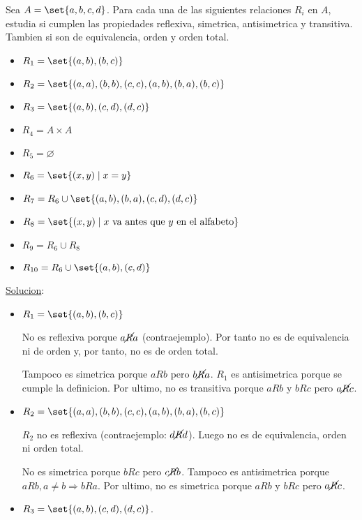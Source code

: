 \begin{example}
	Sea \(A = \set{a,b,c,d}\). Para cada una de las siguientes relaciones \(R_i \) en \(A \), estudia si cumplen las propiedades reflexiva, simetrica, antisimetrica y transitiva. Tambien si son de equivalencia, orden y orden total.
	\begin{itemize}
		\item \(R_1 = \set{(a,b), (b,c )}\)
		\item \(R_2 = \set{(a,a), (b,b), (c,c), (a,b), (b,a), (b,c )}\)
		\item \(R_3 = \set{(a,b), (c,d), (d,c )}\)
		\item \(R_4 = A \times A \)
		\item \(R_5 = \varnothing \)
		\item \(R_6 = \set{(x,y) \mid x = y }\)
		\item \(R_7 = R_6 \cup \set{(a,b), (b,a), (c,d), (d,c)}\)
		\item \(R_8 = \set{(x,y) \mid x \text{ va antes que } y \text{ en el alfabeto} }\)
		\item \(R_9 = R_6 \cup R_8 \)
		\item \(R_{10} = R_6 \cup \set{(a,b), (c,d)}\)
	\end{itemize}
	\underline{Solucion}:

	\begin{itemize}
		\item \(R_1 = \set{(a,b), (b,c )}\)

		      No es reflexiva porque \(a\cancel R a \) (contraejemplo). Por tanto no es de equivalencia ni de orden y, por tanto, no es de orden total.

		      Tampoco es simetrica porque \(aRb \) pero \(b \cancel R a \). \(R_1 \) es antisimetrica porque se cumple la definicion. Por ultimo, no es transitiva porque \(aRb \) y \(bRc \) pero \(a \cancel R c \).

		\item \(R_2 = \set{(a,a), (b,b), (c,c), (a,b), (b,a), (b,c )}\)

		      \(R_2 \) no es reflexiva (contraejemplo: \(d \cancel R d \)). Luego no es de equivalencia, orden ni orden total.

		      No es simetrica porque \(bRc \) pero \(c \cancel R b\). Tampoco es antisimetrica porque \(aRb, a \neq b \Rightarrow bRa \). Por ultimo, no es simetrica porque \(aRb \) y \(bRc \) pero \(a \cancel R c \).

		\item \(R_3 = \set{(a,b), (c,d), (d,c )}\).


\end{itemize}
\end{example}

